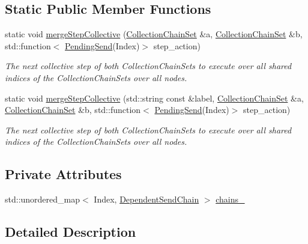 \subsection*{Static Public Member Functions}
\begin{DoxyCompactItemize}
\item 
static void \hyperlink{classvt_1_1messaging_1_1_collection_chain_set_a982745c451229365b57a15a87dc2999e}{merge\+Step\+Collective} (\hyperlink{classvt_1_1messaging_1_1_collection_chain_set}{Collection\+Chain\+Set} \&a, \hyperlink{classvt_1_1messaging_1_1_collection_chain_set}{Collection\+Chain\+Set} \&b, std\+::function$<$ \hyperlink{structvt_1_1messaging_1_1_pending_send}{Pending\+Send}(Index)$>$ step\+\_\+action)
\begin{DoxyCompactList}\small\item\em The next collective step of both Collection\+Chain\+Sets to execute over all shared indices of the Collection\+Chain\+Sets over all nodes. \end{DoxyCompactList}\item 
static void \hyperlink{classvt_1_1messaging_1_1_collection_chain_set_a6560ca64c07967bbd81c57dcd009dd60}{merge\+Step\+Collective} (std\+::string const \&label, \hyperlink{classvt_1_1messaging_1_1_collection_chain_set}{Collection\+Chain\+Set} \&a, \hyperlink{classvt_1_1messaging_1_1_collection_chain_set}{Collection\+Chain\+Set} \&b, std\+::function$<$ \hyperlink{structvt_1_1messaging_1_1_pending_send}{Pending\+Send}(Index)$>$ step\+\_\+action)
\begin{DoxyCompactList}\small\item\em The next collective step of both Collection\+Chain\+Sets to execute over all shared indices of the Collection\+Chain\+Sets over all nodes. \end{DoxyCompactList}\end{DoxyCompactItemize}
\subsection*{Private Attributes}
\begin{DoxyCompactItemize}
\item 
std\+::unordered\+\_\+map$<$ Index, \hyperlink{classvt_1_1messaging_1_1_dependent_send_chain}{Dependent\+Send\+Chain} $>$ \hyperlink{classvt_1_1messaging_1_1_collection_chain_set_afd05e48d93d231320364149fd538beab}{chains\+\_\+}
\end{DoxyCompactItemize}


\subsection{Detailed Description}
